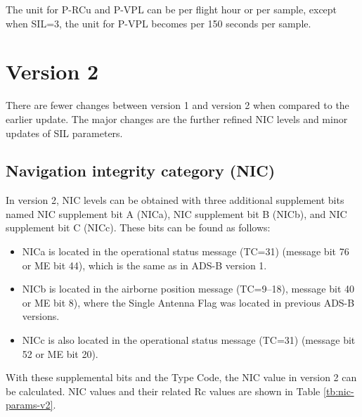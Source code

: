 The unit for P-RCu and P-VPL can be per flight hour or per
sample, except when SIL=3, the unit for P-VPL becomes per 150 seconds per sample.



\section{Version 2}

There are fewer changes between version 1 and version 2 when compared to the earlier update. The major changes are the further refined NIC levels and minor updates of SIL parameters.

\subsection{Navigation integrity category (NIC)}

In version 2, NIC levels can be obtained with three additional supplement bits named NIC supplement bit A (NICa), NIC supplement bit B (NICb), and NIC supplement bit C (NICc). These bits can be found as follows:


\begin{itemize}
  \item NICa is located in the operational status message (TC=31) (message bit 76 or ME bit 44), which is the same as in ADS-B version 1.
  \item NICb is located in the airborne position message (TC=9--18), message bit 40 or ME bit 8), where the Single Antenna Flag was located in previous ADS-B versions.
  \item NICc is also located in the operational status message (TC=31) (message bit 52 or ME bit 20).
\end{itemize}

With these supplemental bits and the Type Code, the NIC value in version 2 can be calculated. NIC values and their related Rc values are shown in Table \ref{tb:nic-params-v2}.


